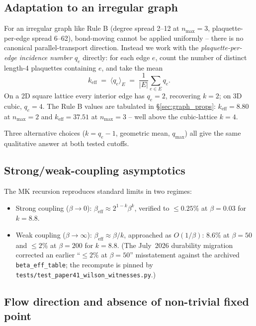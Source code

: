 \documentclass[11pt]{article}
\begin{document}
\subsection{Adaptation to an irregular graph}

For an irregular graph like Rule B (degree spread 2--12 at $n_\text{max}=3$,
plaquette-per-edge spread 6--62), bond-moving cannot be applied uniformly --
there is no canonical parallel-transport direction. Instead we work with the
\emph{plaquette-per-edge incidence number} $q_e$ directly: for each edge $e$,
count the number of distinct length-4 plaquettes containing $e$, and take the
mean
\begin{equation}
k_\text{eff}\;=\;\langle q_e\rangle_E\;=\;
\frac{1}{|E|}\sum_{e\in E}q_e.
\end{equation}
On a 2D square lattice every interior edge has $q_e=2$, recovering $k=2$; on
3D cubic, $q_e=4$. The Rule B values are tabulated in
\S\ref{sec:graph_props}: $k_\text{eff}=8.80$ at $n_\text{max}=2$ and
$k_\text{eff}=37.51$ at $n_\text{max}=3$ -- well above the cubic-lattice $k=4$.

Three alternative choices ($k=q_e-1$, geometric mean, $q_\text{max}$) all give
the same qualitative answer at both tested cutoffs.

\subsection{Strong/weak-coupling asymptotics}

The MK recursion reproduces standard limits in two regimes:
\begin{itemize}
\item Strong coupling ($\beta\to 0$):
$\beta_\text{eff}\approx 2^{1-k}\beta^k$, verified to $\le 0.25\%$ at
$\beta=0.03$ for $k=8.8$.
\item Weak coupling ($\beta\to\infty$):
$\beta_\text{eff}\approx\beta/k$, approached as $O(1/\beta)$: $8.6\%$ at
$\beta=50$ and $\le 2\%$ at $\beta=200$ for $k=8.8$. (The July~2026
durability migration corrected an earlier ``$\le 2\%$ at $\beta=50$''
misstatement against the archived \texttt{beta\_eff\_table}; the recompute
is pinned by \texttt{tests/test\_paper41\_wilson\_witnesses.py}.)
\end{itemize}

\subsection{Flow direction and absence of non-trivial fixed point}
\end{document}
